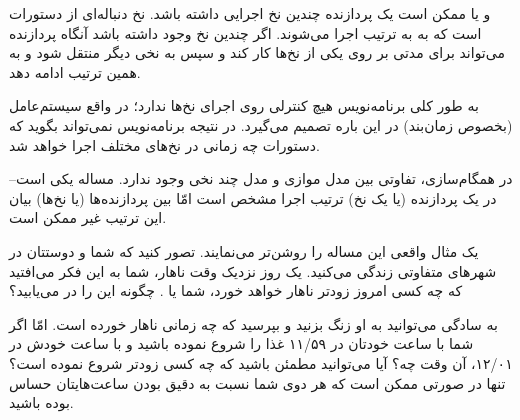\documentclass{book}
\begin{document}
    و یا ممکن است یک پردازنده چندین نخ اجرایی داشته باشد. نخ دنباله‌ای از دستورات است که به به ترتیب اجرا می‌شوند. 
    اگر چندین نخ وجود داشته باشد آنگاه پردازنده می‌تواند برای مدتی بر روی یکی  از نخ‌ها کار کند و سپس به نخی دیگر منتقل شود و به همین 
    ترتیب ادامه دهد. 

    به طور کلی برنامه‌نویس هیچ کنترلی روی اجرای نخ‌ها ندارد؛ در واقع سیستم‌عامل (بخصوص زمان‌بند) در این باره تصمیم‌ می‌گیرد. 
    در نتیجه برنامه‌نویس نمی‌تواند بگوید که دستورات چه زمانی در نخ‌های مختلف اجرا خواهد شد.
    

    در همگام‌سازی، تفاوتی بین مدل موازی و مدل چند نخی وجود ندارد. 
    مساله یکی است--در یک پردازنده (یا یک نخ) ترتیب اجرا مشخص است امّا بین پردازنده‌ها (یا نخ‌ها) بیان این ترتیب غیر ممکن است. 
    
    یک مثال واقعی این مساله را روشن‌تر می‌نمایند. 
    تصور کنید که شما و دوستتان  در شهرهای متفاوتی زندگی می‌کنید. یک روز نزدیک وقت ناهار، شما به این فکر می‌افتید که 
    چه کسی امروز زودتر ناهار خواهد خورد، شما یا . چگونه این را در می‌یابید؟ 
    

    به سادگی می‌توانید به او زنگ بزنید و بپرسید که چه زمانی ناهار خورده است. امّا اگر شما با ساعت خودتان در ۱۱/۵۹ غذا را شروع نموده باشید 
    و  با ساعت خودش در ۱۲/۰۱، آن وقت چه؟ آیا می‌توانید مطمئن باشید که چه کسی زودتر شروع نموده است؟ 
    تنها در صورتی ممکن است که هر دوی شما نسبت به دقیق بودن ساعت‌هایتان حساس بوده باشید.
\end{document}

